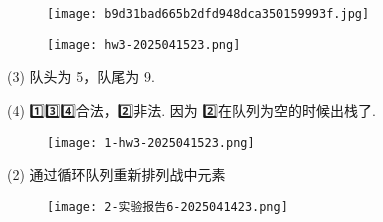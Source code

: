 \begin{figure}[H]
\centering
\texttt{[image: b9d31bad665b2dfd948dca350159993f.jpg]}
\label{}
\end{figure}

\begin{figure}[H]
\centering
\texttt{[image: hw3-2025041523.png]}
\label{}
\end{figure}
(3) 队头为 5，队尾为 9.

(4) 1️⃣3️⃣4️⃣合法，2️⃣非法. 因为 2️⃣在队列为空的时候出栈了.

\begin{figure}[H]
\centering
\texttt{[image: 1-hw3-2025041523.png]}
\label{}
\end{figure}

(2)
通过循环队列重新排列战中元素

\begin{figure}[H]
\centering
\texttt{[image: 2-实验报告6-2025041423.png]}
\label{}
\end{figure}

